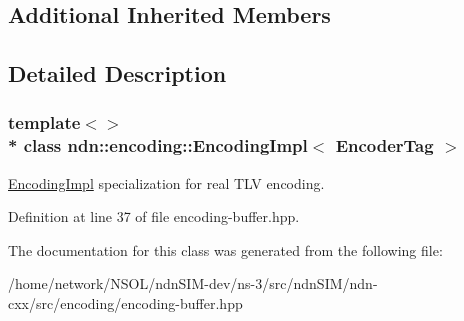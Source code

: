 \subsection*{Additional Inherited Members}


\subsection{Detailed Description}
\subsubsection*{template$<$$>$\\*
class ndn\+::encoding\+::\+Encoding\+Impl$<$ Encoder\+Tag $>$}

\hyperlink{classndn_1_1encoding_1_1EncodingImpl}{Encoding\+Impl} specialization for real T\+LV encoding. 

Definition at line 37 of file encoding-\/buffer.\+hpp.



The documentation for this class was generated from the following file\+:\begin{DoxyCompactItemize}
\item 
/home/network/\+N\+S\+O\+L/ndn\+S\+I\+M-\/dev/ns-\/3/src/ndn\+S\+I\+M/ndn-\/cxx/src/encoding/encoding-\/buffer.\+hpp\end{DoxyCompactItemize}
